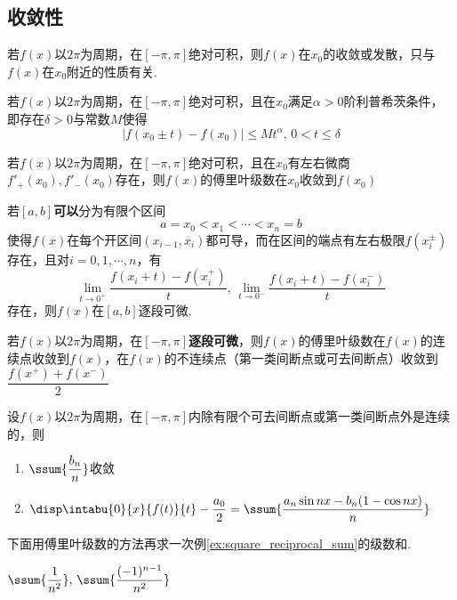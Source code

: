 \subsection{收敛性}
\begin{theorem}[黎曼局部化定理]
若$f(x)$以$2\pi$为周期，在$[-\pi,\pi]$绝对可积，则$f(x)$在$x_0$的收敛或发散，只与$f(x)$在$x_0$附近的性质有关.
\end{theorem}
\begin{theorem}
若$f(x)$以$2\pi$为周期，在$[-\pi,\pi]$绝对可积，且在$x_0$满足$\alpha>0$阶利普希茨条件，即存在$\delta>0$与常数$M$使得
\[|f(x_0\pm t)-f(x_0)|\leq Mt^\alpha,\,0<t\leq\delta\]
\end{theorem}
\begin{corollary2}
若$f(x)$以$2\pi$为周期，在$[-\pi,\pi]$绝对可积，且在$x_0$有左右微商$f'_+(x_0),f'_-(x_0)$存在，则$f(x)$的傅里叶级数在$x_0$收敛到$f(x_0)$
\end{corollary2}
\begin{definition}[逐段可微]
若$[a,b]$\textbf{可以}分为有限个区间
\[a=x_0<x_1<\cdots<x_n=b\]
使得$f(x)$在每个开区间$(x_{i-1},x_i)$都可导，而在区间的端点有左右极限$f(x_i^\pm)$存在，且对$i=0,1,\cdots,n$，有
\[\lim_{t\to 0^+}\dfrac{f(x_i+t)-f(x_i^+)}{t},\,\lim_{t\to 0^-}\dfrac{f(x_i+t)-f(x_i^-)}{t}\]
存在，则$f(x)$在$[a,b]$逐段可微.
\end{definition}
\begin{theorem}[收敛的充分条件]
若$f(x)$以$2\pi$为周期，在$[-\pi,\pi]$\textbf{逐段可微}，则$f(x)$的傅里叶级数在$f(x)$的连续点收敛到$f(x)$，在$f(x)$的不连续点（第一类间断点或可去间断点）收敛到$\dfrac{f(x^+)+f(x^-)}{2}$
\end{theorem}
\begin{theorem}[逐项积分定理]
设$f(x)$以$2\pi$为周期，在$[-\pi,\pi]$内除有限个可去间断点或第一类间断点外是连续的，则
\begin{enumerate}
	\item $\ssum{\dfrac{b_n}{n}}$收敛
	\item $\disp\intabu{0}{x}{f(t)}{t}-\dfrac{a_0}{2}=\ssum{\dfrac{a_n\sin nx-b_n(1-\cos nx)}{n}}$
\end{enumerate}
\end{theorem}
\par 下面用傅里叶级数的方法再求一次例\ref{ex:square_reciprocal_sum}的级数和.
\begin{example}
\label{ex:square_reciprocal_sum2}
$\ssum{\dfrac{1}{n^2}},\,\ssum{\dfrac{(-1)^{n-1}}{n^2}}$
\end{example}

